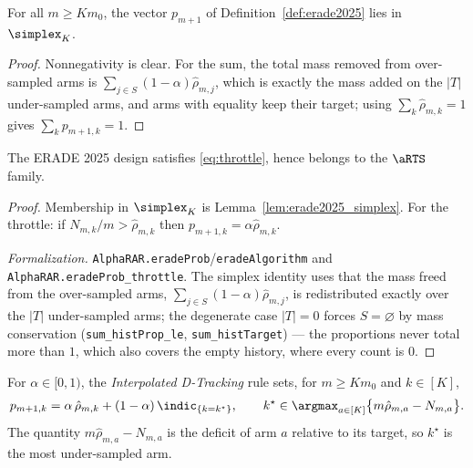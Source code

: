 \begin{lemma}\label{lem:erade2025_simplex}
\leanok
{}
For all $m \ge K m_0$, the vector $p_{m+1}$ of Definition~\ref{def:erade2025}
lies in $\simplex_K$.
\end{lemma}

\begin{proof}\leanok
Nonnegativity is clear. For the sum, the total mass removed from over-sampled
arms is $\sum_{j\in S}(1-\alpha)\hat{\rho}_{m,j}$, which is exactly the mass
added on the $|T|$ under-sampled arms, and arms with equality keep their target;
using $\sum_k \hat{\rho}_{m,k} = 1$ gives $\sum_k p_{m+1,k} = 1$.
\end{proof}

\begin{lemma}\label{lem:erade2025_isARTS}
\leanok
{}
The ERADE 2025 design satisfies \eqref{eq:throttle}, hence belongs to the
$\aRTS$ family.
\end{lemma}

\begin{proof}\leanok
{}
Membership in $\simplex_K$ is Lemma~\ref{lem:erade2025_simplex}. For the throttle:
if $N_{m,k}/m > \hat{\rho}_{m,k}$ then $p_{m+1,k} = \alpha\hat{\rho}_{m,k}$.

\emph{Formalization.} \texttt{AlphaRAR.eradeProb}/\texttt{eradeAlgorithm} and
\texttt{AlphaRAR.eradeProb\_throttle}. The simplex identity uses that the mass freed from the
over-sampled arms, $\sum_{j\in S}(1-\alpha)\hat\rho_{m,j}$, is redistributed exactly over the $|T|$
under-sampled arms; the degenerate case $|T|=0$ forces $S=\varnothing$ by mass conservation
(\texttt{sum\_histProp\_le}, \texttt{sum\_histTarget}) --- the proportions never total more than
$1$, which also covers the empty history, where every count is $0$.
\end{proof}

\begin{definition}\label{def:d_tracking}
\leanok
{}
For $\alpha \in [0,1)$, the \emph{Interpolated D-Tracking} rule sets, for
$m \ge K m_0$ and $k \in [K]$,
\[
  p_{m+1,k} = \alpha\, \hat{\rho}_{m,k} + (1-\alpha)\,\indic_{\{k = k^\star\}},
  \qquad
  k^\star \in \argmax_{a \in [K]} \big\{ m\hat{\rho}_{m,a} - N_{m,a} \big\}.
\]
The quantity $m\hat{\rho}_{m,a} - N_{m,a}$ is the deficit of arm $a$ relative to
its target, so $k^\star$ is the most under-sampled arm.
\end{definition}

